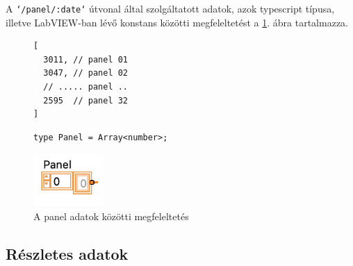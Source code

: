A \texttt{`/panel/:date`} útvonal által szolgáltatott adatok, azok typescript
típusa, illetve LabVIEW-ban lévő konstans közötti megfeleltetést a
\ref{fig:panel}. ábra tartalmazza.
\begin{figure}[H]
  \centering
  \begin{minipage}{.3\textwidth}
    \begin{verbatim}
[
  3011, // panel 01
  3047, // panel 02
  // ..... panel ..
  2595  // panel 32
]
    \end{verbatim}
  \end{minipage}\begin{minipage}{.3\textwidth}
    \begin{verbatim}
type Panel = Array<number>;
    \end{verbatim}
  \end{minipage}\begin{minipage}{.3\textwidth}
    \flushright
    \includegraphics[height=2cm]{static/lv-panel.png}
  \end{minipage}

  \caption{A panel adatok közötti megfeleltetés}
  \label{fig:panel}
\end{figure}

\subsection{Részletes adatok}

